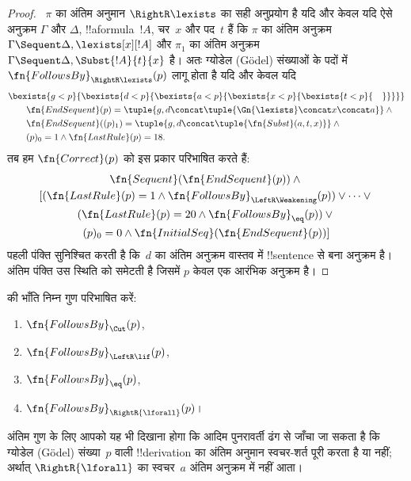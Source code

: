 \documentclass[../../../include/open-logic-section]{subfiles}
\begin{document}
\begin{proof}
~$\pi$ का अंतिम अनुमान $\RightR\lexists$ का सही अनुप्रयोग है यदि और केवल यदि
ऐसे अनुक्रम $\Gamma$ और $\Delta$, !!a{formula}~$!A$, चर~$x$ और पद~$t$ हैं कि
$\pi$ का अंतिम अनुक्रम $\Gamma \Sequent \Delta, \lexists[x][!A]$ और
$\pi_1$ का अंतिम अनुक्रम $\Gamma \Sequent \Delta, \Subst{!A}{t}{x}$ है। अतः
ग्योडेल (G\"odel) संख्याओं के पदों में $\fn{FollowsBy}_{\RightR\lexists}(p)$
लागू होता है यदि और केवल यदि
\begin{align*}
  & \bexists{g<p}{\bexists{d<p}{\bexists{a<p}{\bexists{x<p}{\bexists{t<p}{\quad}}}}}\\
  & \qquad \fn{EndSequent}(p) = 
  \tuple{
    g,
    d \concat \tuple{\Gn{\lexists} \concat x \concat a}
  } \land {}\\
  & \qquad \fn{EndSequent}((p)_1) = 
  \tuple{
    g,
    d \concat \tuple{\fn{Subst}(a, t, x)}
  } \land {}\\
  & \qquad (p)_0 = 1 \land \fn{LastRule}(p) = 18.
\end{align*}
तब हम $\fn{Correct}(p)$ को इस प्रकार परिभाषित करते हैं:
\begin{multline*}
  \fn{Sequent}(\fn{EndSequent}(p)) \land {}\\ 
  [(\fn{LastRule}(p) = 1 \land 
  \fn{FollowsBy}_{\LeftR\Weakening}(p)) \lor \dots \lor {}\\
  (\fn{LastRule}(p) = 20 \land \fn{FollowsBy}_{\eq}(p)) \lor {}\\
  (p)_0 = 0 \land \fn{InitialSeq}(\fn{EndSequent}(p))]
\end{multline*}
पहली पंक्ति सुनिश्चित करती है कि~$d$ का अंतिम अनुक्रम वास्तव में !!{sentence}
से बना अनुक्रम है। अंतिम पंक्ति उस स्थिति को समेटती है जिसमें $p$ केवल एक
आरंभिक अनुक्रम है।
\end{proof}

\begin{prob}
   की भाँति निम्न गुण परिभाषित करें:
  \begin{enumerate}
  \item $\fn{FollowsBy}_{\Cut}(p)$,
  \item $\fn{FollowsBy}_{\LeftR\lif}(p)$,
  \item $\fn{FollowsBy}_{\eq}(p)$,
  \item $\fn{FollowsBy}_{\RightR{\lforall}}(p)$।
  \end{enumerate}
  अंतिम गुण के लिए आपको यह भी दिखाना होगा कि आदिम पुनरावर्ती ढंग से जाँचा
  जा सकता है कि ग्योडेल (G\"odel) संख्या~$p$ वाली !!{derivation} का अंतिम
  अनुमान स्वचर-शर्त पूरी करता है या नहीं; अर्थात् $\RightR{\lforall}$ का
  स्वचर~$a$ अंतिम अनुक्रम में नहीं आता।
  \end{prob}
  
\end{document}
